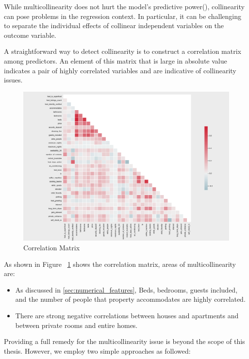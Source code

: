 While multicollinearity does not hurt the model's predictive
power(\textcite{kutner2005applied}), collinearity can pose problems in the
regression context. In particular,  it can be challenging to separate the
individual effects of collinear independent variables on the outcome variable.

A straightforward way to detect collinearity is to construct a correlation
matrix among predictors.  An element of this matrix that is large in absolute
value indicates a pair of highly correlated variables and are indicative of
collinearity issues.

\begin{figure}[H] \centering
\includegraphics[width=\textwidth,keepaspectratio]{figures/correlation-matrix.png}
\caption{Correlation Matrix}
\label{fig:correlation-matrix}
\end{figure}

As shown in Figure ~\ref{fig:correlation-matrix} shows the correlation matrix,
areas of multicollinearity are:
\begin{itemize}
    \item As discussed in \ref{sec:numerical_features},
        Beds, bedrooms, guests included, and the number of people that property
        accommodates are highly correlated.
    \item There are strong negative correlations between houses and apartments
        and between private rooms and entire homes.
\end{itemize}

Providing a full remedy for the multicollinearity issue is beyond the scope of
this thesis. However, we employ two  simple approaches as followed:

